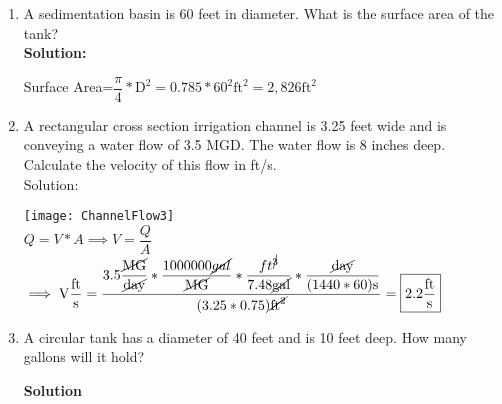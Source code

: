 \documentclass{article}
\begin{document}
 


\begin{enumerate}

\item A sedimentation basin is 60 feet in diameter. What is the surface area of the tank?\\

 

\textbf{Solution:}

\vspace{0.2cm}

Surface Area=$\dfrac{\pi}{4}*\mathrm{D}^2=0.785*60^2 \mathrm{ft}^2 =\boxed{2,826 \mathrm{ft}^2}$

\vspace{0.2cm}

 

 

\item A rectangular cross section irrigation channel is 3.25 feet wide and is conveying a water flow of 3.5 MGD. The water flow is 8 inches deep. Calculate the velocity of this flow in ft/s.\\

Solution:\\

\vspace{0.3cm}

\texttt{[image: ChannelFlow3]}\\

$Q=V*A \implies V=\dfrac{Q}{A}$\\

$\implies \mathrm{V}\dfrac{\mathrm{ft}}{\mathrm{s}}=\dfrac{3.5\dfrac{\cancel{\mathrm{MG}}}{\cancel{\mathrm{day}}}*\dfrac{1000000\cancel{gal}}{\cancel{\mathrm{MG}}}*\dfrac{ft^{\cancel{3}}}{7.48\cancel{\mathrm{gal}}}*\dfrac{\cancel{\mathrm{day}}}{(1440*60)\mathrm{s}}}{(3.25*0.75)\cancel{\mathrm{ft}^2}}=\boxed{2.2\dfrac{\mathrm{ft}}{\mathrm{s}}}$

\vspace{0.5cm}

 

\item A circular tank has a diameter of 40 feet and is 10 feet deep. How many gallons will it hold?

 

\textbf{Solution}\\
\\


\end{enumerate}
\end{document}
